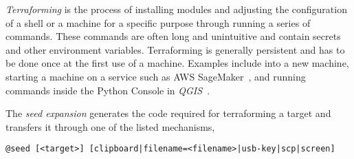 \emph{Terraforming} is the process of installing modules and adjusting the configuration of a shell or a machine for a specific purpose through running a series of commands. These commands are often long and unintuitive and contain secrets and other environment variables. Terraforming is generally persistent and has to be done once at the first use of a machine. Examples include  into a new machine, starting a machine on a service such as AWS SageMaker~\cite{sagemaker}, and running commands inside the Python Console in \emph{QGIS}~\cite{QGIS_python_console}. 

The \emph{seed expansion} generates the code required for terraforming a target and transfers it through one of the listed mechanisms,
%
\begin{graybox}
\begin{verbatim}
@seed [<target>] [clipboard|filename=<filename>|usb-key|scp|screen]
\end{verbatim}
\end{graybox}
